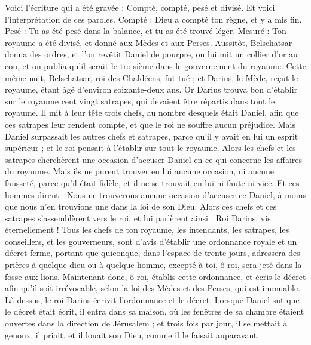 \begin{multicols}{2}
Voici l'écriture qui a été gravée : Compté, compté, pesé et divisé.
Et voici l'interprétation de ces paroles. Compté : Dieu a compté ton règne, et y a mis fin.
Pesé : Tu as été pesé dans la balance, et tu as été trouvé léger.
Mesuré : Ton royaume a été divisé, et donné aux Mèdes et aux Perses.
Aussitôt, Belschatsar donna des ordres, et l'on revêtit Daniel de pourpre, on lui mit un collier d'or au cou, et on publia qu'il serait le troisième dans le gouvernement du royaume.
Cette même nuit, Belschatsar, roi des Chaldéens, fut tué ;
et Darius, le Mède, reçut le royaume, étant âgé d'environ soixante-deux ans.
\VerseOne{}Or Darius trouva bon d'établir sur le royaume cent vingt satrapes, qui devaient être répartis dans tout le royaume.
Il mit à leur tête trois chefs, au nombre desquels était Daniel, afin que ces satrapes leur rendent compte, et que le roi ne souffre aucun préjudice.
Mais Daniel surpassait les autres chefs et satrapes, parce qu'il y avait en lui un esprit supérieur ; et le roi pensait à l'établir sur tout le royaume.
Alors les chefs et les satrapes cherchèrent une occasion d'accuser Daniel en ce qui concerne les affaires du royaume. Mais ils ne purent trouver en lui aucune occasion, ni aucune fausseté, parce qu'il était fidèle, et il ne se trouvait en lui ni faute ni vice.
Et ces hommes dirent : Nous ne trouverons aucune occasion d'accuser ce Daniel, à moins que nous n'en trouvions une dans la loi de son Dieu.
Alors ces chefs et ces satrapes s'assemblèrent vers le roi, et lui parlèrent ainsi : Roi Darius, vis éternellement !
Tous les chefs de ton royaume, les intendants, les satrapes, les conseillers, et les gouverneurs, sont d'avis d'établir une ordonnance royale et un décret ferme, portant que quiconque, dans l'espace de trente jours, adressera des prières à quelque dieu ou à quelque homme, excepté à toi, ô roi, sera jeté dans la fosse aux lions.
Maintenant donc, ô roi, établis cette ordonnance, et écris le décret afin qu'il soit irrévocable, selon la loi des Mèdes et des Perses, qui est immuable.
Là-dessus, le roi Darius écrivit l'ordonnance et le décret.
Lorsque Daniel sut que le décret était écrit, il entra dans sa maison, où les fenêtres de sa chambre étaient ouvertes dans la direction de Jérusalem ; et trois fois par jour, il se mettait à genoux, il priait, et il louait son Dieu, comme il le faisait auparavant.

\end{multicols}
